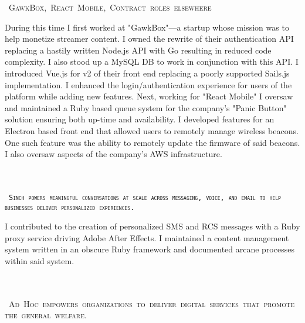 \documentclass{muratcan_cv}
\begin{document}
    \mbox { \scshape \hspace{1.2em} \tiny{GawkBox, React Mobile, Contract roles elsewhere}}\\
    \indent \indent \begin{minipage}{0.96\linewidth} \footnotesize
            During this time I first worked at "GawkBox"—a startup whose mission was to help monetize streamer content. I owned the rewrite of their authentication API replacing a hastily written Node.js API with Go resulting in reduced code complexity. I also stood up a MySQL DB to work in conjunction with this API. I introduced Vue.js for v2 of their front end replacing a poorly supported Sails.js implementation. I enhanced the login/authentication experience for users of the platform while adding new features. Next, working for "React Mobile" I oversaw and maintained a Ruby based queue system for the company's "Panic Button" solution ensuring both up-time and availability. I developed features for an Electron based front end that allowed users to remotely manage wireless beacons. One such feature was the ability to remotely update the firmware of said beacons. I also oversaw aspects of the company's AWS infrastructure.
    \end{minipage} \\[0.1cm]\\
    \mbox { \scshape \hspace{1.2em} \tiny{\texttt{Sinch powers meaningful conversations at scale across
    messaging, voice, and email to help businesses deliver personalized experiences.}}}\\
    \indent \indent \begin{minipage}{0.96\linewidth} \footnotesize
     I contributed to the creation of personalized SMS and RCS messages with a Ruby proxy service driving Adobe After Effects. I maintained a content management system written in an obscure Ruby framework and documented arcane processes within said system.
    \end{minipage} \\[0.1cm]\\
    \mbox { \scshape \hspace{1.2em} \tiny{Ad Hoc empowers organizations to deliver digital
    services that promote the general welfare.}}\\
\end{document}
